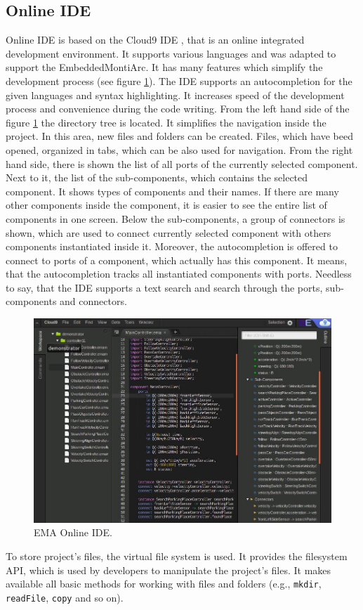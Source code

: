 \subsection{Online IDE} \label{sec:onlineide}
Online IDE \cite{OnlineIDEBA17} is based on the Cloud9 IDE \cite{gadhikar2013browser, malan2017web}, that is an online integrated development environment. It supports various languages and was adapted to support the EmbeddedMontiArc. It has many features which simplify the development process (see figure \ref{fig:onlineIDE}). The IDE supports an autocompletion for the given languages and syntax highlighting. It increases speed of the development process and convenience during the code writing. From the left hand side of the figure \ref{fig:onlineIDE} the directory tree is located. It simplifies the navigation inside the project. In this area, new files and folders can be created. Files, which have beed opened, organized in tabs, which can be also used for navigation. From the right hand side, there is shown the list of all ports of the currently selected component. Next to it, the list of the sub-components, which contains the selected component. It shows types of components and their names. If there are many other components inside the component, it is easier to see the entire list of components in one screen. Below the sub-components, a group of connectors is shown, which are used to connect currently selected component with others components instantiated inside it. Moreover, the autocompletion is offered to connect to ports of a component, which actually has this component. It means, that the autocompletion tracks all instantiated components with ports. Needless to say, that the IDE supports a text search and search through the ports, sub-components and connectors.
\begin{figure}[h!]
    \centering
    \includegraphics[width=\linewidth]{src/pic/onlineIDE}
    \caption{EMA Online IDE.}
    \label{fig:onlineIDE}
\end{figure} \newline
To store project's files, the virtual file system \cite{VFS} is used. It provides the filesystem API, which is used by developers to manipulate the project's files. It makes available all basic methods for working with files and folders (e.g., \texttt{mkdir}, \texttt{readFile}, \texttt{copy} and so on).


